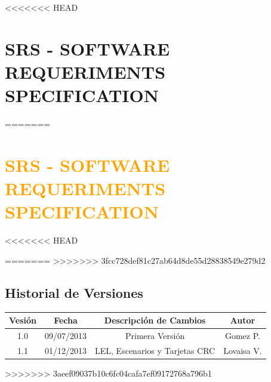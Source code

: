 <<<<<<< HEAD
\chapter{\textcolor[gray]{.2}{SRS - SOFTWARE REQUERIMENTS SPECIFICATION}}
=======
\chapter{\textcolor{orange}{SRS - SOFTWARE REQUERIMENTS SPECIFICATION}}
<<<<<<< HEAD

=======
>>>>>>> 3fcc728def81c27ab64d8de55d28838549e279d2
\newpage
\section{\textcolor[gray]{.2}{Historial de Versiones}}
\begin{table}[h!]
\begin{center}
\begin{tabular}{|c|c|c|c|}
\hline
\rowcolor[gray]{.8} Vesión & Fecha & Descripción de Cambios & Autor\\
\hline
1.0 & 09/07/2013 & Primera Versión & Gomez P.\\
\hline
1.1 & 01/12/2013 & LEL, Escenarios y Tarjetas CRC & Lovaisa V.\\
\hline

\end{tabular}
\end{center}
\end{table}
>>>>>>> 3aeef09037b10c6fc04cafa7ef09172768a796b1

